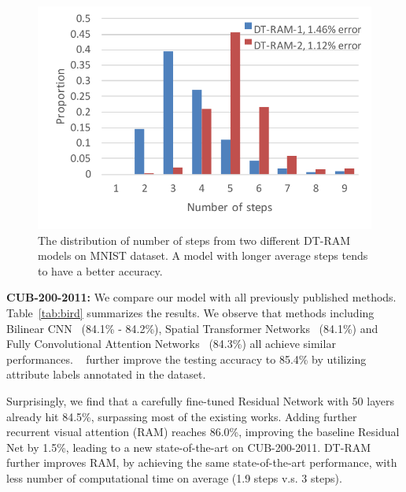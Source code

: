 \documentclass[10pt,twocolumn,letterpaper]{article}
\begin{document}
\setlength{\tabcolsep}{1pt}
\begin{figure}
\begin{center}
    \includegraphics[width=0.95\linewidth]{figs/exp/mnist_distribution.pdf}
\end{center}
\vspace{-10pt}
\caption{The distribution of number of steps from two different DT-RAM models on MNIST dataset. A model with longer average steps tends to have a better accuracy.}
\label{fig:MNIST}
\end{figure}

{\bf CUB-200-2011:} We compare our model with all previously published methods.
Table~\ref{tab:bird} summarizes the results.
We observe that methods including Bilinear CNN~\cite{lin2015bilinear, kong2016low} (84.1\% - 84.2\%), Spatial Transformer Networks~\cite{jaderberg2015spatial} (84.1\%) and Fully Convolutional Attention Networks~\cite{liu2016fine} (84.3\%) all achieve similar performances.
~\cite{liu2016localizing} further improve the testing accuracy to 85.4\% by utilizing attribute labels annotated in the dataset.

Surprisingly, we find that a carefully fine-tuned Residual Network with 50 layers already hit 84.5\%, surpassing most of the existing works.
Adding further recurrent visual attention (RAM) reaches 86.0\%, improving the baseline Residual Net by 1.5\%, leading to a new state-of-the-art on CUB-200-2011.
DT-RAM further improves RAM, by achieving the same state-of-the-art performance, with less number of computational time on average (1.9 steps v.s. 3 steps).
\end{document}
